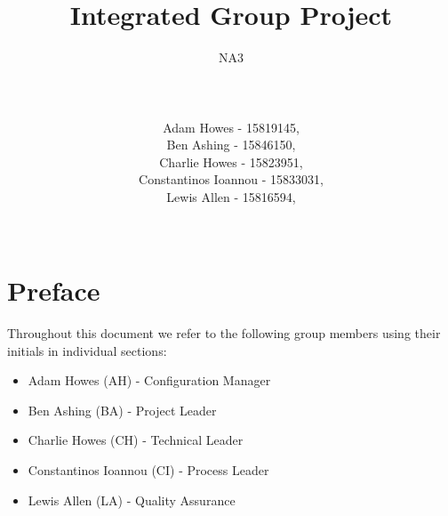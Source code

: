 \documentclass[a4paper]{article}
\title{\vspace{-2cm}Integrated Group Project}
\author{NA3
	\\ \rule{5cm}{0.4pt}
	\\Adam Howes - 15819145,
	\\Ben Ashing - 15846150,
	\\Charlie Howes - 15823951,
	\\Constantinos Ioannou - 15833031,
	\\Lewis Allen - 15816594,
    \\ \rule{5cm}{0.4pt}
} %
\begin{document}
\maketitle

\tableofcontents

\break

\section{Preface}
Throughout this document we refer to the following group members using their initials in individual sections:
\begin{itemize}
    \item Adam Howes (AH) - Configuration Manager 
    \item Ben Ashing (BA) - Project Leader
    \item Charlie Howes (CH) - Technical Leader
    \item Constantinos Ioannou (CI) - Process Leader
    \item Lewis Allen (LA) - Quality Assurance
\end{itemize}
\end{document}
